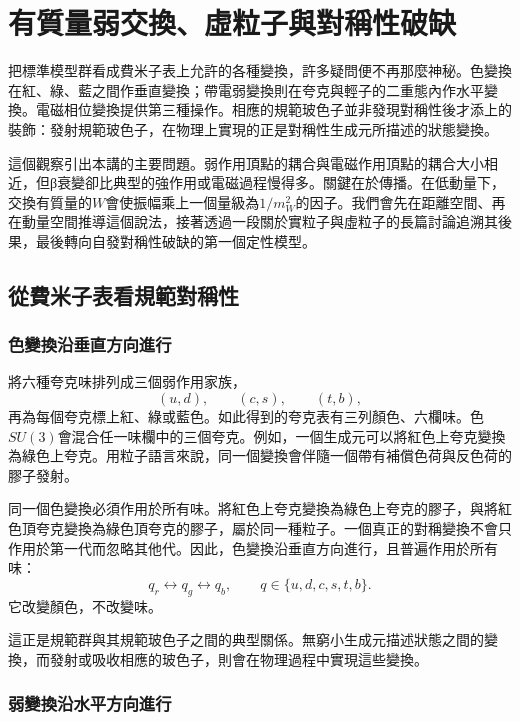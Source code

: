 \chapter{有質量弱交換、虛粒子與對稱性破缺}

把標準模型群看成費米子表上允許的各種變換，許多疑問便不再那麼神秘。色變換在紅、綠、藍之間作垂直變換；帶電弱變換則在夸克與輕子的二重態內作水平變換。電磁相位變換提供第三種操作。相應的規範玻色子並非發現對稱性後才添上的裝飾：發射規範玻色子，在物理上實現的正是對稱性生成元所描述的狀態變換。

這個觀察引出本講的主要問題。弱作用頂點的耦合與電磁作用頂點的耦合大小相近，但{\proseunicodefont β}衰變卻比典型的強作用或電磁過程慢得多。關鍵在於傳播。在低動量下，交換有質量的\(W\)會使振幅乘上一個量級為\(1/m_W^2\)的因子。我們會先在距離空間、再在動量空間推導這個說法，接著透過一段關於實粒子與虛粒子的長篇討論追溯其後果，最後轉向自發對稱性破缺的第一個定性模型。

\section{從費米子表看規範對稱性}

\subsection{色變換沿垂直方向進行}

將六種夸克味排列成三個弱作用家族，
\begin{equation}
  (u,d),\qquad(c,s),\qquad(t,b),
\end{equation}
再為每個夸克標上紅、綠或藍色。如此得到的夸克表有三列顏色、六欄味。色\(SU(3)\)會混合任一味欄中的三個夸克。例如，一個生成元可以將紅色上夸克變換為綠色上夸克。用粒子語言來說，同一個變換會伴隨一個帶有補償色荷與反色荷的膠子發射。

同一個色變換必須作用於所有味。將紅色上夸克變換為綠色上夸克的膠子，與將紅色頂夸克變換為綠色頂夸克的膠子，屬於同一種粒子。一個真正的對稱變換不會只作用於第一代而忽略其他代。因此，色變換沿垂直方向進行，且普遍作用於所有味：
\begin{equation}
  q_r\longleftrightarrow q_g\longleftrightarrow q_b,
  \qquad q\in\{u,d,c,s,t,b\}.
\end{equation}
它改變顏色，不改變味。

這正是規範群與其規範玻色子之間的典型關係。無窮小生成元描述狀態之間的變換，而發射或吸收相應的玻色子，則會在物理過程中實現這些變換。

\subsection{弱變換沿水平方向進行}

